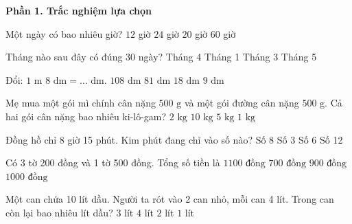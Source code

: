\textbf{Phần 1. Trắc nghiệm lựa chọn}

\begin{ex} %
Một ngày có bao nhiêu giờ?
\choice
{$12$ giờ}
{\True $24$ giờ}
{$20$ giờ}
{$60$ giờ}
\end{ex}

\begin{ex} %
Tháng nào sau đây có đúng $30$ ngày?
\choice
{\True Tháng 4}
{Tháng 1}
{Tháng 3}
{Tháng 5}
\end{ex}

\begin{ex} %
Đổi: $1\text{ m } 8\text{ dm} = \dots\text{ dm}$.
\choice
{$108\text{ dm}$}
{$81\text{ dm}$}
{\True $18\text{ dm}$}
{$9\text{ dm}$}
\end{ex}

\begin{ex} %
Mẹ mua một gói mì chính cân nặng $500\text{ g}$ và một gói đường cân nặng $500\text{ g}$. Cả hai gói cân nặng bao nhiêu ki-lô-gam?
\choice
{$2\text{ kg}$}
{$10\text{ kg}$}
{$5\text{ kg}$}
{\True $1\text{ kg}$}
\end{ex}

\begin{ex} %
Đồng hồ chỉ 8 giờ 15 phút. Kim phút đang chỉ vào số nào?
\choice
{Số 8}
{\True Số 3}
{Số 6}
{Số 12}
\end{ex}

\begin{ex} %
Có 3 tờ 200 đồng và 1 tờ 500 đồng. Tổng số tiền là
\choice
{\True $1 100\text{ đồng}$}
{$700\text{ đồng}$}
{$900\text{ đồng}$}
{$1 000\text{ đồng}$}
\end{ex}

\begin{ex} %
Một can chứa 10 lít dầu. Người ta rót vào 2 can nhỏ, mỗi can 4 lít. Trong can còn lại bao nhiêu lít dầu?
\choice
{$3$ lít}
{$4$ lít}
{\True $2$ lít}
{$1$ lít}
\end{ex}

